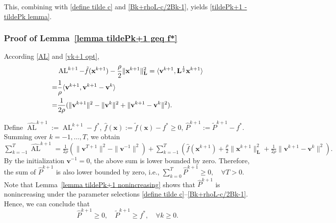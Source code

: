 \documentclass[12pt,draftcls,onecolumn]{IEEEtran}
\begin{document}
This, combining with \eqref{define tilde c} and \eqref{Bk+rhoL-c/2Bk-1}, yields \eqref{tildePk+1 - tildePk lemma}.

\subsubsection{Proof of Lemma~\ref{lemma tildePk+1 geq f*}}\label{proof lemma tildePk+1 geq f*}
According \eqref{AL} and \eqref{vk+1 opt}, 
\begin{align}
	&\operatorname{AL}^{k+1}-\tilde{f}(\mathbf{x}^{k+1})-\frac{\rho}{2}\|\mathbf{x}^{k+1}\|^2_\mathbf{L}= \langle \mathbf{v}^{k+1},\mathbf{L}^{\frac{1}{2}}\mathbf{x}^{k+1} \rangle\notag\\
	=& \frac{1}{\rho} \langle \mathbf{v}^{k+1},\mathbf{v}^{k+1}- \mathbf{v}^{k}\rangle  \notag\\
	=&\frac{1}{2\rho}(\|\mathbf{v}^{k+1}\|^2-\|\mathbf{v}^{k}\|^2+\|\mathbf{v}^{k+1}-\mathbf{v}^{k}\|^2 ). \label{ALk+1 - fxk+1}
\end{align}
 
Define $\widehat{\operatorname{AL}}^{k+1}:=\operatorname{AL}^{k+1}-f^*$, $\hat{f}(\mathbf{x}):=\tilde{f}(\mathbf{x})-f^*\geq 0$, $\hat{P}^{k+1}:= \tilde{P}^{k+1}-f^*$. Summing over $k=-1,\dots,T$, we obtain $\sum_{k=-1}^T \widehat{\operatorname{AL}}^{k+1} = \frac{1}{2\rho}(\|\mathbf{v}^{T+1}\|^2-\|\mathbf{v}^{-1}\|^2)
    + \sum_{k=-1}^T (\hat{f}(\mathbf{x}^{k+1})+\frac{\rho}{2}\|\mathbf{x}^{k+1}\|^2_\mathbf{L}+\frac{1}{2\rho}\|\mathbf{v}^{k+1}-\mathbf{v}^k\|^2).$
By the initialization $\mathbf{v}^{-1}=0$, the above sum is lower bounded by zero. Therefore, the sum of $\hat{P}^{k+1}$ is also lower bounded by zero, i.e., 
	$\sum_{k=0}^T \hat{P}^{k+1}\geq 0, \quad \forall T>0$. 
Note that Lemma~\ref{lemma tildePk+1 nonincreasing} shows that $\hat{P}^{k+1}$ is nonincreasing under the parameter selections \eqref{define tilde c}--\eqref{Bk+rhoL-c/2Bk-1}. Hence, we can conclude that
\begin{equation}
	\hat{P}^{k+1}\geq 0, \quad \tilde{P}^{k+1}\geq f^*, \quad \forall k \geq 0. \label{hat Pk+1 geq 0 tildePk+1 geq f*}
\end{equation}
\end{document}
